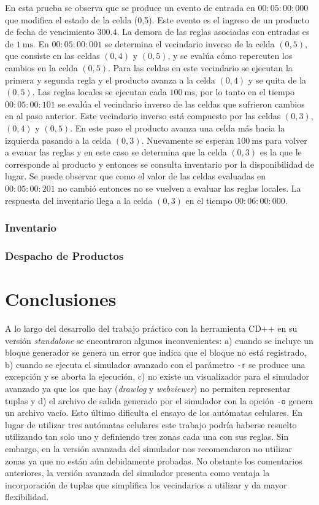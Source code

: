 \documentclass[10pt]{article}
\begin{document}
En esta prueba se observa que se produce un evento de entrada en $00:05:00:000$ que modifica el estado de la celda (0,5). Este evento es el ingreso de un producto de fecha de vencimiento $300.4$. La demora de las reglas asociadas con entradas es de $1~\textrm{ms}$. En $00:05:00:001$ se determina el vecindario inverso de la celda $(0,5)$, que consiste en las celdas $(0,4)$ y $(0,5)$, y se evalúa cómo repercuten los cambios en la celda $(0,5)$. Para las celdas en este vecindario se ejecutan la primera y segunda regla y el producto avanza a la celda $(0,4)$ y se quita de la $(0,5)$. Las reglas locales se ejecutan cada $100~\textrm{ms}$, por lo tanto en el tiempo $00:05:00:101$ se evalúa el vecindario inverso de las celdas que sufrieron cambios en al paso anterior. Este vecindario inverso está compuesto por las celdas $(0,3)$, $(0,4)$ y $(0,5)$. En este paso el producto avanza una celda más hacia la izquierda pasando a la celda $(0,3)$. Nuevamente se esperan $100~\textrm{ms}$ para volver a evauar las reglas y en este caso se determina que la celda $(0,3)$ es la que le corresponde al producto y entonces se consulta inventario por la disponibilidad de lugar. Se puede observar que como el valor de las celdas evaluadas en $00:05:00:201$ no cambió entonces no se vuelven a evaluar las reglas locales. La respuesta del inventario llega a la celda $(0,3)$ en el tiempo $00:06:00:000$.

\subsubsection{Inventario}

\subsubsection{Despacho de Productos}

\section{Conclusiones}

A lo largo del desarrollo del trabajo práctico con la herramienta CD++ en su versión \textit{standalone} se encontraron algunos inconvenientes: a) cuando se incluye un bloque generador se genera un error que indica que el bloque no está registrado, b) cuando se ejecuta el simulador avanzado con el parámetro \texttt{-r} se produce una excepción y se aborta la ejecución, c) no existe un visualizador para el simulador avanzado ya que los que hay (\textit{drawlog} y \textit{webviewer}) no permiten representar tuplas y d) el archivo de salida generado por el simulador con la opción \texttt{-o} genera un archivo vacío. Esto último dificulta el ensayo de los autómatas celulares. En lugar de utilizar tres autómatas celulares este trabajo podría haberse resuelto utilizando tan solo uno y definiendo tres zonas cada una con sus reglas. Sin embargo, en la versión avanzada del simulador nos recomendaron no utilizar zonas ya que no están aún debidamente probadas. No obstante los comentarios anteriores, la versión avanzada del simulador presenta como ventaja la incorporación de tuplas que simplifica los vecindarios a utilizar y da mayor flexibilidad.
\end{document}
